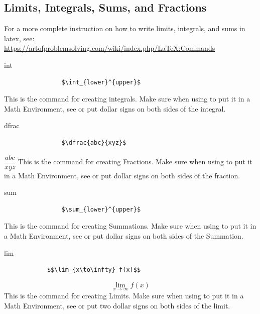 	\subsection{Limits, Integrals, Sums, and Fractions}
		For a more complete instruction on how to write limits, integrals, and sums in latex, see:\\
		\url{https://artofproblemsolving.com/wiki/index.php/LaTeX:Commands}
		\begin{docCommand}{int}{}
			\begin{verbatim}
				$\int_{lower}^{upper}$
			\end{verbatim}
			This is the command for creating integrals. Make sure when using to put it in a Math Environment, see  or put dollar signs on both sides of the integral.
		\end{docCommand}
		\begin{docCommand}{dfrac}{}{}
			\begin{verbatim}
				$\dfrac{abc}{xyz}$
			\end{verbatim}
			$\dfrac{abc}{xyz}$
			This is the command for creating Fractions. Make sure when using to put it in a Math Environment, see  or put dollar signs on both sides of the fraction.
		\end{docCommand}
		\begin{docCommand}{sum}{}
			\begin{verbatim}
				$\sum_{lower}^{upper}$
			\end{verbatim}
			This is the command for creating Summations. Make sure when using to put it in a Math Environment, see  or put dollar signs on both sides of the Summation.
		\end{docCommand}	
		\begin{docCommand}{lim}{}
			\begin{verbatim}
			$$\lim_{x\to\infty} f(x)$$
			\end{verbatim}
			$$\lim_{x\to\infty} f(x)$$
			This is the command for creating Limits. Make sure when using to put it in a Math Environment, see  or put two dollar signs on both sides of the limit.
		\end{docCommand}	
